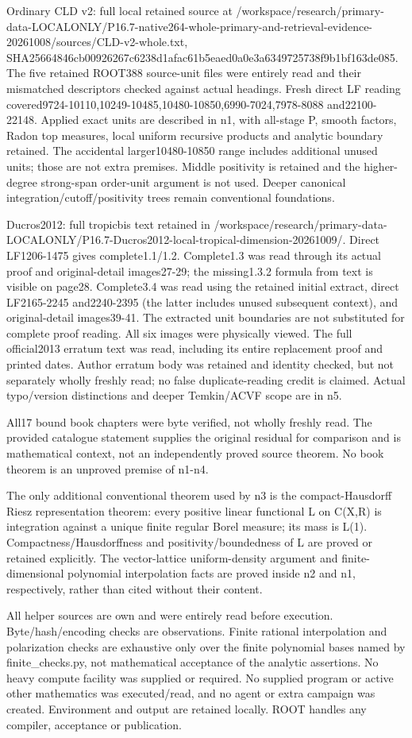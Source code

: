 \documentclass[11pt]{article}
\begin{document}
Ordinary CLD v2: full local retained source at /workspace/research/primary-data-LOCALONLY/P16.7-native264-whole-primary-and-retrieval-evidence-20261008/sources/CLD-v2-whole.txt, SHA25664846cb00926267c6238d1afac61b5eaed0a0e3a6349725738f9b1bf163de085. The five retained ROOT388 source-unit files were entirely read and their mismatched descriptors checked against actual headings. Fresh direct LF reading covered9724-10110,10249-10485,10480-10850,6990-7024,7978-8088 and22100-22148. Applied exact units are described in n1, with all-stage P, smooth factors, Radon top measures, local uniform recursive products and analytic boundary retained. The accidental larger10480-10850 range includes additional unused units; those are not extra premises. Middle positivity is retained and the higher-degree strong-span order-unit argument is not used. Deeper canonical integration/cutoff/positivity trees remain conventional foundations.

Ducros2012: full tropicbis text retained in /workspace/research/primary-data-LOCALONLY/P16.7-Ducros2012-local-tropical-dimension-20261009/. Direct LF1206-1475 gives complete1.1/1.2. Complete1.3 was read through its actual proof and original-detail images27-29; the missing1.3.2 formula from text is visible on page28. Complete3.4 was read using the retained initial extract, direct LF2165-2245 and2240-2395 (the latter includes unused subsequent context), and original-detail images39-41. The extracted unit boundaries are not substituted for complete proof reading. All six images were physically viewed. The full official2013 erratum text was read, including its entire replacement proof and printed dates. Author erratum body was retained and identity checked, but not separately wholly freshly read; no false duplicate-reading credit is claimed. Actual typo/version distinctions and deeper Temkin/ACVF scope are in n5.

All17 bound book chapters were byte verified, not wholly freshly read. The provided catalogue statement supplies the original residual for comparison and is mathematical context, not an independently proved source theorem. No book theorem is an unproved premise of n1-n4.

The only additional conventional theorem used by n3 is the compact-Hausdorff Riesz representation theorem: every positive linear functional L on C(X,R) is integration against a unique finite regular Borel measure; its mass is L(1). Compactness/Hausdorffness and positivity/boundedness of L are proved or retained explicitly. The vector-lattice uniform-density argument and finite-dimensional polynomial interpolation facts are proved inside n2 and n1, respectively, rather than cited without their content.

All helper sources are own and were entirely read before execution. Byte/hash/encoding checks are observations. Finite rational interpolation and polarization checks are exhaustive only over the finite polynomial bases named by finite\_checks.py, not mathematical acceptance of the analytic assertions. No heavy compute facility was supplied or required. No supplied program or active other mathematics was executed/read, and no agent or extra campaign was created. Environment and output are retained locally. ROOT handles any compiler, acceptance or publication.
\end{document}
